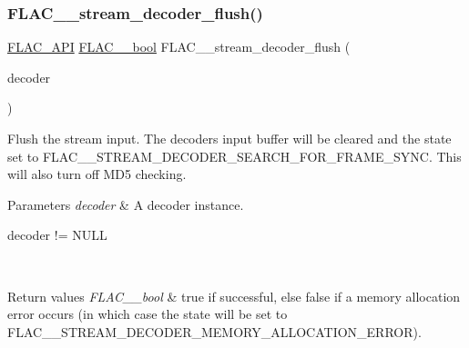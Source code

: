 \subsubsection{\texorpdfstring{F\+L\+A\+C\+\_\+\+\_\+stream\+\_\+decoder\+\_\+flush()}{FLAC\_\_stream\_decoder\_flush()}}
{\footnotesize\ttfamily \hyperlink{group__flac__export_ga56ca07df8a23310707732b1c0007d6f5}{F\+L\+A\+C\+\_\+\+A\+PI} \hyperlink{ordinals_8h_a95103469f1cbd78b8cf250194985b34e}{F\+L\+A\+C\+\_\+\+\_\+bool} F\+L\+A\+C\+\_\+\+\_\+stream\+\_\+decoder\+\_\+flush (\begin{DoxyParamCaption}\item[{\hyperlink{struct_f_l_a_c_____stream_decoder}{F\+L\+A\+C\+\_\+\+\_\+\+Stream\+Decoder} $\ast$}]{decoder }\end{DoxyParamCaption})}

Flush the stream input. The decoder\textquotesingle{}s input buffer will be cleared and the state set to {\ttfamily F\+L\+A\+C\+\_\+\+\_\+\+S\+T\+R\+E\+A\+M\+\_\+\+D\+E\+C\+O\+D\+E\+R\+\_\+\+S\+E\+A\+R\+C\+H\+\_\+\+F\+O\+R\+\_\+\+F\+R\+A\+M\+E\+\_\+\+S\+Y\+NC}. This will also turn off M\+D5 checking.


\begin{DoxyParams}{Parameters}
{\em decoder} & A decoder instance.  
\begin{DoxyCode}
decoder != NULL 
\end{DoxyCode}
 \\
\hline
\end{DoxyParams}

\begin{DoxyRetVals}{Return values}
{\em F\+L\+A\+C\+\_\+\+\_\+bool} & {\ttfamily true} if successful, else {\ttfamily false} if a memory allocation error occurs (in which case the state will be set to {\ttfamily F\+L\+A\+C\+\_\+\+\_\+\+S\+T\+R\+E\+A\+M\+\_\+\+D\+E\+C\+O\+D\+E\+R\+\_\+\+M\+E\+M\+O\+R\+Y\+\_\+\+A\+L\+L\+O\+C\+A\+T\+I\+O\+N\+\_\+\+E\+R\+R\+OR}). \\
\hline
\end{DoxyRetVals}
\mbox{\label{group__flac__stream__decoder_ga2e4bae93f2ebf49babd88bb5fe54bd24}} 
